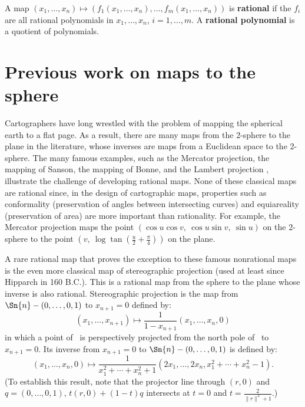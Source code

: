 \documentclass[12pt]{article}
\begin{document}
\begin{defn2}
A map $(x_1,\ldots,x_n) \mapsto (f_1 (x_1,\ldots,x_n),\ldots,f_m (x_1,\ldots,x_n))$
is {\bf rational} if 
the $f_i$ are all rational polynomials in $x_1,\ldots,x_n$, $i=1,\ldots,m$.
A {\bf rational polynomial} is a quotient of polynomials.
\end{defn2}


\section{Previous work on maps to the sphere}
\label{sec:prev}

Cartographers have long wrestled with the problem of mapping the spherical earth
to a flat page.
As a result, there are many maps from the 2-sphere to the plane in the literature,
whose inverses are maps from a Euclidean space to the 2-sphere.
The many famous examples, such as the Mercator projection, the mapping of Sanson,
the mapping of Bonne, and the Lambert projection \cite{kreyszig59},
illustrate the challenge of developing rational maps.
None of these classical maps are rational since, in the design 
of cartographic maps, 
properties such as conformality (preservation of angles between 
intersecting curves) and equiareality (preservation of area) are more important 
than rationality.
For example, the Mercator projection maps the point
$(\cos u \cos v,\ \cos u \sin v,\ \sin u)$ on the 2-sphere 
to the point $(v,\ \log \tan (\frac{u}{2} + \frac{\pi}{4}))$ on the plane.

A rare rational map that proves the exception to these famous nonrational maps
is the even more classical map of stereographic projection
(used at least since Hipparch in 160 B.C.). %
This is a rational map from the sphere to the plane
whose inverse is also rational. 
Stereographic projection is the map from 
$\Sn{n} - (0,\ldots,0,1)$ to $x_{n+1}=0$ defined by:
\[ (x_1,\ldots,x_{n+1}) \mapsto \frac{1}{1-x_{n+1}} (x_1,\ldots,x_n,0) \]
in which a point of \ is perspectively projected from 
the north pole of \ to $x_{n+1}=0$.  %
Its inverse from
$x_{n+1}=0$ to $\Sn{n} - (0,\ldots,0,1)$ is defined by:
\begin{equation}
\label{eq:spinverse}
(x_1,\ldots,x_n,0) \mapsto
	\frac{1}{x_1^2 + \cdots + x_n^2 + 1} 
	(2x_1, \ldots, 2x_n, x_1^2 + \cdots + x_n^2 - 1).
\end{equation}
(To establish this result, note that the projector line through $(r,0)$ 
and $q = (0,\ldots,0,1)$, $t(r,0) + (1-t)q$
intersects  at $t=0$ and $t=\frac{2}{\|r\|^2 + 1}$.)
\end{document}
